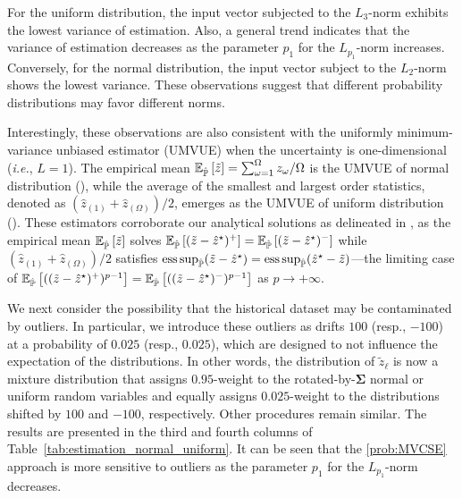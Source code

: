 \documentclass[opre, nonblindrev]{informswp}
\newcommand{\1}[1]{\mathds{1}{\left(#1\right)}}
\begin{document}
For the uniform distribution, the input vector subjected to the $L_3$-norm exhibits the lowest variance of estimation. Also, a general trend indicates that the variance of estimation decreases as the parameter $p_1$ for the $L_{p_1}$-norm increases. Conversely, for the normal distribution, the input vector subject to the $L_2$-norm shows the lowest variance. These observations suggest that different probability distributions may favor different norms. 

Interestingly, these observations are also consistent with the uniformly minimum-variance unbiased estimator (UMVUE) when the uncertainty is one-dimensional (\textit{i.e.}, $L = 1$). The empirical mean $\mathbb{E}_{\hat{\mathbb{P}}}\left[\tilde{z}\right] =  \sum_{\omega = 1}^\Omega z_\omega/\Omega$ is the UMVUE of normal distribution (\citealt{rohatgi2015introduction}), while the average of the smallest and largest order statistics, denoted as $(\hat z_{(1)} + \hat{z}_{(\Omega)})/2$, emerges as the UMVUE of uniform distribution (\citealt{bar1985minimum}). 
These estimators corroborate our analytical solutions as delineated in , as the empirical mean $\mathbb{E}_{\hat{\mathbb{P}}}\left[\tilde z\right]$ solves $\mathbb{E}_{\hat{\mathbb{P}}}\left[(\tilde{z} -\hat{z}^\star )^+\right] = \mathbb{E}_{\hat{\mathbb{P}}}\left[(\tilde{z} - \hat{z}^\star )^-\right]$ while $(\hat{z}_{(1)} + \hat{z}_{(\Omega)})/2$ satisfies $\operatorname*{ess\,sup}_{\hat{\mathbb{P}}}(\tilde{z} - \hat{z}^\star ) = \operatorname*{ess\,sup}_{\hat{\mathbb{P}}} ( \hat{z}^\star - \tilde{z})$---the limiting case of $\mathbb{E}_{\hat{\mathbb{P}}}\left[((\tilde z - \hat z^\star)^{+})^{p-1}\right] = \mathbb{E}_{\hat{\mathbb{P}}}\left[((\tilde z - \hat z^\star)^{-})^{p-1}\right]$ as $p \to +\infty$.

We next consider the possibility that the historical dataset may be contaminated by outliers. In particular, we introduce these outliers as drifts $100$ (resp., $-100$) at a probability of $0.025$ (resp., $0.025$), which are designed to not influence the expectation of the distributions. In other words, the distribution of $\tilde z_\ell$ is now a mixture distribution that assigns $0.95$-weight to the rotated-by-$\bm \Sigma$ normal or uniform random variables and equally assigns $0.025$-weight to the distributions shifted by $100$ and $-100$, respectively. Other procedures remain similar. The results are presented in the third and fourth columns of Table~\ref{tab:estimation_normal_uniform}. It can be seen that the \ref{prob:MVCSE} approach is more sensitive to outliers as the parameter $p_1$ for the $L_{p_1}$-norm decreases.
\end{document}
